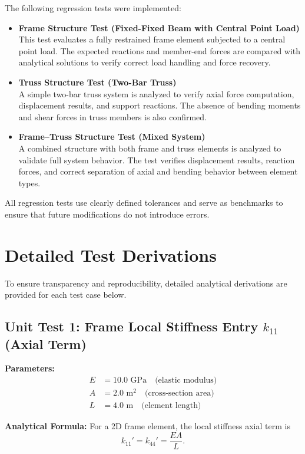 The following regression tests were implemented:
\begin{itemize}
    \item \textbf{Frame Structure Test (Fixed-Fixed Beam with Central Point Load)} \\
    This test evaluates a fully restrained frame element subjected to a central point load. The expected reactions and member-end forces are compared with analytical solutions to verify correct load handling and force recovery.
    \item \textbf{Truss Structure Test (Two-Bar Truss)} \\
    A simple two-bar truss system is analyzed to verify axial force computation, displacement results, and support reactions. The absence of bending moments and shear forces in truss members is also confirmed.
    \item \textbf{Frame--Truss Structure Test (Mixed System)} \\
    A combined structure with both frame and truss elements is analyzed to validate full system behavior. The test verifies displacement results, reaction forces, and correct separation of axial and bending behavior between element types.
\end{itemize}

All regression tests use clearly defined tolerances and serve as benchmarks to ensure that future modifications do not introduce errors.

\section{Detailed Test Derivations}

To ensure transparency and reproducibility, detailed analytical derivations are provided for each test case below.

\subsection*{Unit Test 1: Frame Local Stiffness Entry $k_{11}$ (Axial Term)}

\textbf{Parameters:}
\begin{align*}
E &= 10.0 \text{ GPa} \quad \text{(elastic modulus)} \\
A &= 2.0 \text{ m}^2 \quad \text{(cross-section area)} \\
L &= 4.0 \text{ m} \quad \text{(element length)}
\end{align*}

\textbf{Analytical Formula:}
For a 2D frame element, the local stiffness axial term is
\[
k_{11}' = k_{44}' = \frac{EA}{L}.
\]

